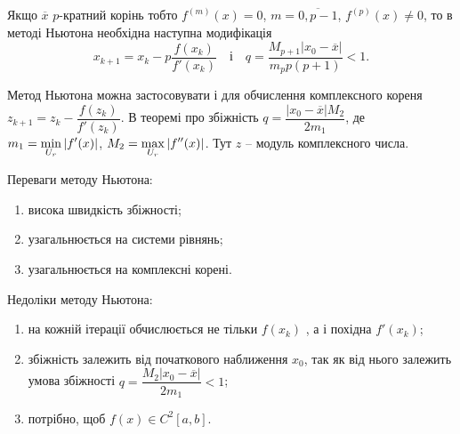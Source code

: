 \begin{remark}
	Якщо $\overline{x}$ $p$-кратний корінь тобто $f^{(m)} (x) = 0$, $m = \overline{0,p-1}$, $f^{ (p)} (x) \ne 0$, то в методі Ньютона необхідна наступна модифікація \[x_{k+1} = x_k - p\dfrac{f(x_k)}{f'(x_k)} \quad \text{і} \quad q = \dfrac{M_{p+1}|x_0-\overline{x}|}{m_p p(p+1)}<1.\]
\end{remark}

\begin{remark}
Метод Ньютона можна застосовувати і для обчислення комплексного кореня $z_{k+1} = z_k - \dfrac{f(z_k)}{f'(z_k)}$. В теоремі про збіжність $q = \dfrac{|x_0-\overline{x}|M_2}{2m_1}$, де $m_1 = \displaystyle\min\limits_{U_r} |f'(x)|$, $M_2 = \displaystyle\max\limits_{U_r} |f''(x)|$. Тут $z$ -- модуль комплексного числа.
\end{remark}

Переваги методу Ньютона: 
\begin{enumerate}
\item висока швидкість збіжності;
\item узагальнюється на системи рівнянь; 
\item узагальнюється на комплексні корені.
\end{enumerate}
Недоліки методу Ньютона: 
\begin{enumerate}
	\item на кожній ітерації обчислюється не тільки $f (x_k )$ , а і похідна $f'(x_k)$;
	\item  збіжність залежить від початкового наближення $x_0$, так як від нього залежить умова збіжності $q = \dfrac{M_2|x_0-\overline{x}|}{2m_1} < 1$;
	\item потрібно, щоб $f (x)\in C^2 [a,b]$.
\end{enumerate}